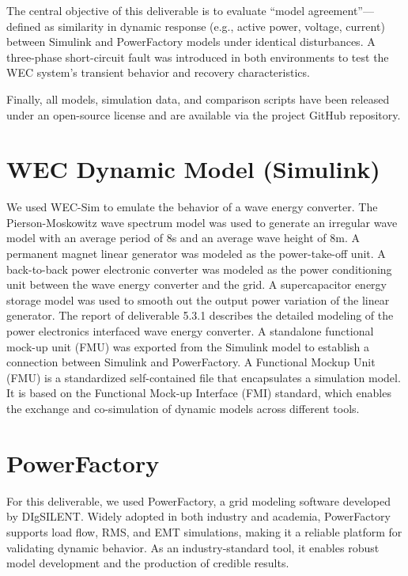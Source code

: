 \documentclass[conference]{IEEEtran}
\begin{document}
    The central objective of this deliverable is to evaluate “model agreement”—defined as similarity in dynamic response (e.g., active power, voltage, current) between Simulink and PowerFactory models under identical disturbances. A three-phase short-circuit fault was introduced in both environments to test the WEC system’s transient behavior and recovery characteristics.
    
    Finally, all models, simulation data, and comparison scripts have been released under an open-source license and are available via the project GitHub repository.
    


\section*{WEC Dynamic Model (Simulink)}

    We used WEC-Sim to emulate the behavior of a wave energy converter. The Pierson-Moskowitz wave spectrum model was used to generate an irregular wave model with an average period of 8s and an average wave height of 8m. A permanent magnet linear generator was modeled as the power-take-off unit.  A back-to-back power electronic converter was modeled as the power conditioning unit between the wave energy converter and the grid. A supercapacitor energy storage model was used to smooth out the output power variation of the linear generator. The report of deliverable 5.3.1 describes the detailed modeling of the power electronics interfaced wave energy converter. 
    A standalone functional mock-up unit (FMU) was exported from the Simulink model to establish a connection between Simulink and PowerFactory. A Functional Mockup Unit (FMU) is a standardized self-contained file that encapsulates a simulation model. It is based on the Functional Mock-up Interface (FMI) standard, which enables the exchange and co-simulation of dynamic models across different tools. 

    
\section*{PowerFactory}
    
    For this deliverable, we used PowerFactory, a grid modeling software developed by DIgSILENT. Widely adopted in both industry and academia, PowerFactory supports load flow, RMS, and EMT simulations, making it a reliable platform for validating dynamic behavior. As an industry-standard tool, it enables robust model development and the production of credible results.
    
\end{document}
